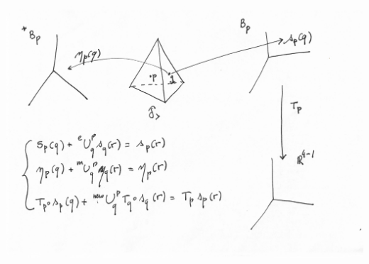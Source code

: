 \documentclass[xcolor=svgnames]{beamer}
\begin{document}
\begin{frame}[plain]

  \includegraphics[height=.8\textheight]{exercise/scheme.pdf}
  
\end{frame}
\end{document}
